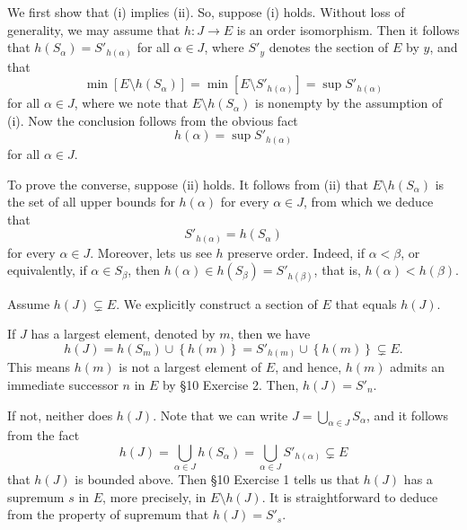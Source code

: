 \documentclass[a4paper,12pt]{article}
\begin{document}
\begin{sol}\leavevmode \par
	We first show that (i) implies (ii).
	So, suppose (i) holds.
	Without loss of generality, we may assume that \( h:J\to E \) is an order isomorphism.
	Then it follows that
	\( h(S_{\alpha}) = S'_{h(\alpha)} \) for all \( \alpha \in J \),
	where \( S'_{y} \) denotes the section of \( E \) by \( y \),
	and that
	\begin{equation*}
		\min{\left[ E \setminus h(S_{\alpha}) \right]}
		=
		\min{\left[ E \setminus S'_{h(\alpha)} \right]}
		=
		\sup{S'_{h(\alpha)}}
	\end{equation*}
	for all \( \alpha \in J \),
	where we note that \( E \setminus h(S_{\alpha}) \)
	is nonempty by the assumption of (i).
	Now the conclusion follows from the obvious fact 
	\begin{equation*}
		h(\alpha) = \sup{S'_{h(\alpha)}}
	\end{equation*}
	for all \( \alpha \in J \).
	
	To prove the converse,
	suppose (ii) holds.
	It follows from (ii) that
	\( E \setminus h(S_{\alpha}) \)
	is the set of all upper bounds for \( h(\alpha) \)
	for every \( \alpha \in J \),
	from which we deduce that
	\begin{equation}\label{eq:preserve_section}
		S'_{h(\alpha)} = h(S_{\alpha})
	\end{equation}
	for every \( \alpha \in J \).
	Moreover,  lets us see \( h \) preserve order.
	Indeed, if \( \alpha < \beta \), or equivalently, if \( \alpha \in S_{\beta} \),
	then \( h(\alpha) \in h(S_{\beta}) = S'_{h(\beta)}\),
	that is,
	\( h(\alpha) < h(\beta) \).
	
	Assume \( h(J) \subsetneq E \).
	We explicitly construct a section of \( E \) that equals \( h(J) \).
	
	If \( J \) has a largest element, denoted by \( m \),
	then we have
	\begin{equation*}
		h(J)
		=
		h(S_m) \cup \left\{ h(m) \right\}
		=
		S'_{h(m)}\cup \left\{ h(m) \right\}
		\subsetneq
		E.
	\end{equation*}
	This means \( h(m) \) is not a largest element of \( E \),
	and hence, \( h(m) \) admits an immediate successor \( n \) in \( E \)
	by \S10 Exercise 2.
	Then, \( h(J)=S'_n \).
	
	If not, neither does \( h(J) \).
	Note that we can write \( J=\bigcup_{\alpha \in J}S_{\alpha} \),
	and
	it follows from the fact
	\begin{equation*}
		h(J)
		=
		\bigcup_{\alpha \in J}h(S_{\alpha})
		=
		\bigcup_{\alpha \in J}S'_{h(\alpha)}
		\subsetneq
		E
	\end{equation*}
	that \( h(J) \) is bounded above.
	Then \S10 Exercise 1 tells us that \( h(J) \) has a supremum \( s \) in \( E \), more precisely, in \( E \setminus h(J) \).
	It is straightforward to deduce from the property of supremum that
	\( h(J) = S'_s\).
	

\end{sol}
\end{document}
